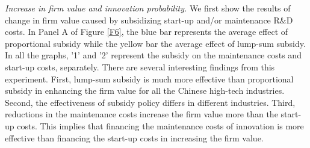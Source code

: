 \documentclass[11pt]{article}
\begin{document}
\textit{Increase in firm value and innovation probability.} We first show the results of change in firm value caused by subsidizing start-up and/or maintenance R\&D costs. In Panel A of Figure \ref{F6}, the blue bar represents the average effect of proportional subsidy while the yellow bar the average effect of lump-sum subsidy. In all the graphs, '1' and '2' represent the subsidy on the maintenance costs and start-up costs, separately. There are several interesting findings from this experiment. First, lump-sum subsidy is much more effective than proportional subsidy in enhancing the firm value for all the Chinese high-tech industries. Second, the effectiveness of subsidy policy differs in different industries. Third, reductions in the maintenance costs increase the firm value more than the start-up costs. This implies that financing the maintenance costs of innovation is more effective than financing the start-up costs in increasing the firm value. 
\end{document}
